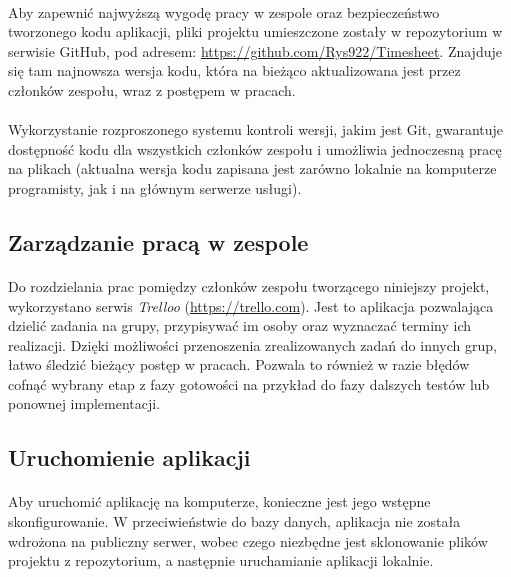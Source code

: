 \documentclass[a4paper, 12pt, oneside]{article}
\begin{document}
			\paragraph{}Aby zapewnić najwyższą wygodę pracy w zespole oraz bezpieczeństwo tworzonego kodu aplikacji, pliki projektu umieszczone zostały w repozytorium w serwisie GitHub, pod adresem:  \url{https://github.com/Rys922/Timesheet}. Znajduje się tam najnowsza wersja kodu, która na bieżąco aktualizowana jest przez członków zespołu, wraz z postępem w pracach.
			\paragraph{} Wykorzystanie rozproszonego systemu kontroli wersji, jakim jest Git, gwarantuje dostępność kodu dla wszystkich członków zespołu i umożliwia jednoczesną pracę na plikach (aktualna wersja kodu zapisana jest zarówno lokalnie na komputerze programisty, jak i na głównym serwerze usługi).
			\subsection{Zarządzanie pracą w zespole}
			\paragraph{}Do rozdzielania prac pomiędzy członków zespołu tworzącego niniejszy projekt, wykorzystano serwis \textit{Trelloo} (\url{https://trello.com}). Jest to aplikacja pozwalająca dzielić zadania na grupy, przypisywać im osoby oraz wyznaczać terminy ich realizacji. Dzięki możliwości przenoszenia zrealizowanych zadań do innych grup, łatwo śledzić bieżący postęp w pracach. Pozwala to również w razie błędów cofnąć wybrany etap z fazy gotowości na przykład do fazy dalszych testów lub ponownej implementacji. 
		\subsection{Uruchomienie aplikacji}
			\paragraph{} Aby uruchomić aplikację na komputerze, konieczne jest jego wstępne skonfigurowanie. W przeciwieństwie do bazy danych, aplikacja nie została wdrożona na publiczny serwer, wobec czego niezbędne jest sklonowanie plików projektu z repozytorium, a następnie uruchamianie aplikacji lokalnie.
\end{document}
